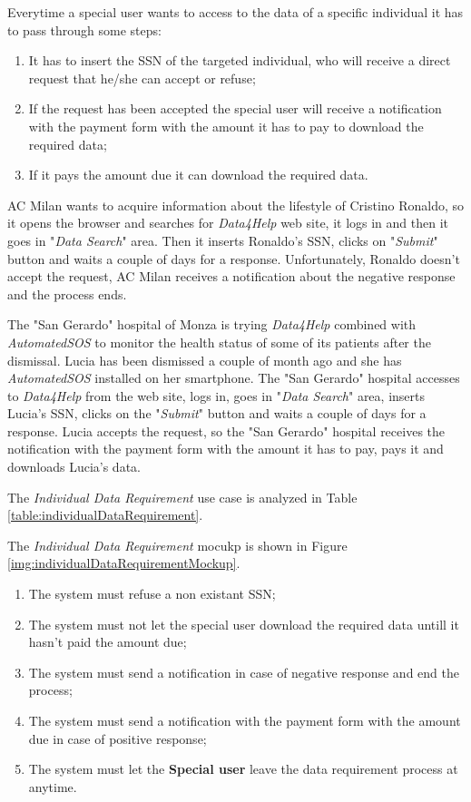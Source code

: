 Everytime a special user wants to access to the data of a specific individual it has to pass through some steps:
\begin{enumerate}
  \item It has to insert the SSN of the targeted individual, who will receive a direct request that he/she can accept or refuse;
  \item If the request has been accepted the special user will receive a notification with the payment form with the amount it has to pay to download the required data;
  \item If it pays the amount due it can download the required data.
\end{enumerate}

AC Milan wants to acquire information about the lifestyle of Cristino Ronaldo, so it opens the browser and searches for \textit{Data4Help} web site, it logs in and then it goes in "\textit{Data Search}" area. Then it inserts Ronaldo's SSN, clicks on "\textit{Submit}" button and waits a couple of days for a response. Unfortunately, Ronaldo doesn't accept the request, AC Milan receives a notification about the negative response and the process ends.

The "San Gerardo" hospital of Monza is trying \textit{Data4Help} combined with \textit{AutomatedSOS} to monitor the health status of some of its patients after the dismissal. Lucia has been dismissed a couple of month ago and she has \textit{AutomatedSOS} installed on her smartphone. The "San Gerardo" hospital accesses to \textit{Data4Help} from the web site, logs in, goes in "\textit{Data Search}" area, inserts Lucia's SSN, clicks on the "\textit{Submit}" button and waits a couple of days for a response. Lucia accepts the request, so the "San Gerardo" hospital receives the notification with the payment form with the amount it has to pay, pays it and downloads Lucia's data.

The \textit{Individual Data Requirement} use case is analyzed in Table \ref{table:individualDataRequirement}.

The \textit{Individual Data Requirement} mocukp is shown in Figure \ref{img:individualDataRequirementMockup}.

\begin{enumerate}
  \item The system must refuse a non existant SSN;
  \item The system must not let the special user download the required data untill it hasn't paid the amount due;
  \item The system must send a notification in case of negative response and end the process;
  \item The system must send a notification with the payment form with the amount due in case of positive response;
  \item The system must let the \textbf{Special user} leave the data requirement process at anytime.
\end{enumerate}

